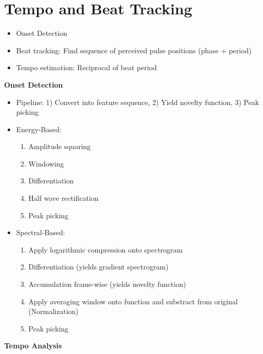 \documentclass{scrartcl}
\begin{document}
\section{Tempo and Beat Tracking}
\begin{itemize}
    \item
        Onset Detection
    \item
        Beat tracking: Find sequence of perceived pulse positions (phase + period)
    \item
        Tempo estimation: Reciprocal of beat period
\end{itemize}
\textbf{Onset Detection}
\begin{itemize}
    \item
        Pipeline: 1) Convert into feature sequence, 2) Yield novelty function, 3) Peak picking
    \item
        Energy-Based:
        \begin{enumerate}
            \item
                Amplitude squaring
            \item
                Windowing
            \item
                Differentiation
            \item
                Half wave rectification
            \item
                Peak picking
        \end{enumerate}
    \item
        Spectral-Based:
        \begin{enumerate}
            \item
                Apply logarithmic compression onto spectrogram
            \item
                Differentiation (yields gradient spectrogram)
            \item
                Accumulation frame-wise (yields novelty function)
            \item
                Apply averaging window onto function and substract from original (Normalization)
            \item
                Peak picking
        \end{enumerate}
\end{itemize}
\textbf{Tempo Analysis}
\end{document}
